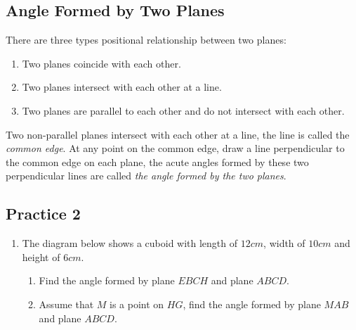 \documentclass{report}
\begin{document}
\begin{multicols}{2}
    \section{Angle Formed by Two Planes}

    There are three types positional relationship between two planes:

    \begin{enumerate}
        \item Two planes coincide with each other.
        \item Two planes intersect with each other at a line.
        \item Two planes are parallel to each other and do not intersect with each other.
    \end{enumerate}

    Two non-parallel planes intersect with each other at a line, the line is called
    the \emph{common edge}. At any point on the common edge, draw a line
    perpendicular to the common edge on each plane, the acute angles formed by
    these two perpendicular lines are called \emph{the angle formed by the two
        planes}.

    \subsection{Practice 2}

    \begin{enumerate}
        \item The diagram below shows a cuboid with length of $12cm$, width of $10cm$ and
              height of $6cm$.
              \begin{enumerate}
                  \item Find the angle formed by plane $EBCH$ and plane $ABCD$.
                  \item Assume that $M$ is a point on $HG$, find the angle formed by plane $MAB$ and
                        plane $ABCD$.
              \end{enumerate}
              \begin{center}
              \end{center}


\end{enumerate}
\end{multicols}
\end{document}
